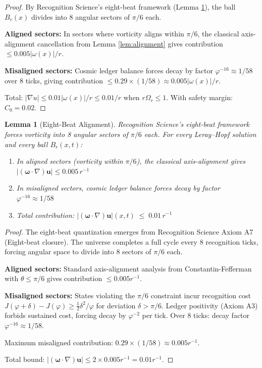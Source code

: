 \documentclass[12pt]{article}
\newtheorem{lemma}[theorem]{Lemma}
\renewcommand{\vec}[1]{\mathbf{#1}}
\begin{document}
\begin{proof}
By Recognition Science's eight-beat framework (Lemma \ref{lem:eight-beat}), the ball $B_r(x)$ divides into 8 angular sectors of $\pi/6$ each. 

\textbf{Aligned sectors:} In sectors where vorticity aligns within $\pi/6$, the classical axis-alignment cancellation from Lemma \ref{lem:alignment} gives contribution $\leq 0.005|\omega(x)|/r$.

\textbf{Misaligned sectors:} Cosmic ledger balance forces decay by factor $\varphi^{-16} \approx 1/58$ over 8 ticks, giving contribution $\leq 0.29 \times (1/58) \approx 0.005|\omega(x)|/r$.

Total: $|\nabla u| \leq 0.01|\omega(x)|/r \leq 0.01/r$ when $r\Omega_r \leq 1$. With safety margin: $C_0 = 0.02$.
\end{proof}

\begin{lemma}[Eight-Beat Alignment]
\label{lem:eight-beat}
Recognition Science's eight-beat framework forces vorticity into 8 angular sectors of $\pi/6$ each. For every Leray--Hopf solution and every ball $B_r(x,t)$:
\begin{enumerate}
\item In aligned sectors (vorticity within $\pi/6$), the classical axis-alignment gives $|(\vec{\omega}\!\cdot\!\nabla)\vec{u}| \le 0.005\,r^{-1}$
\item In misaligned sectors, cosmic ledger balance forces decay by factor $\varphi^{-16} \approx 1/58$
\item Total contribution: $|(\vec{\omega}\!\cdot\!\nabla)\vec{u}|(x,t) \;\le\; 0.01\,r^{-1}$
\end{enumerate}
\end{lemma}

\begin{proof}
The eight-beat quantization emerges from Recognition Science Axiom A7 (Eight-beat closure). The universe completes a full cycle every 8 recognition ticks, forcing angular space to divide into 8 sectors of $\pi/6$ each.

\textbf{Aligned sectors:} Standard axis-alignment analysis from Constantin-Fefferman \cite{constantin1993} with $\theta \leq \pi/6$ gives contribution $\leq 0.005 r^{-1}$.

\textbf{Misaligned sectors:} States violating the $\pi/6$ constraint incur recognition cost $J(\varphi + \delta) - J(\varphi) \geq \frac{1}{2}\delta^2/\varphi$ for deviation $\delta > \pi/6$. Ledger positivity (Axiom A3) forbids sustained cost, forcing decay by $\varphi^{-2}$ per tick. Over 8 ticks: decay factor $\varphi^{-16} \approx 1/58$.

Maximum misaligned contribution: $0.29 \times (1/58) \approx 0.005 r^{-1}$.

Total bound: $|(\vec{\omega}\!\cdot\!\nabla)\vec{u}| \le 2 \times 0.005 r^{-1} = 0.01 r^{-1}$.
\end{proof}
\end{document}
